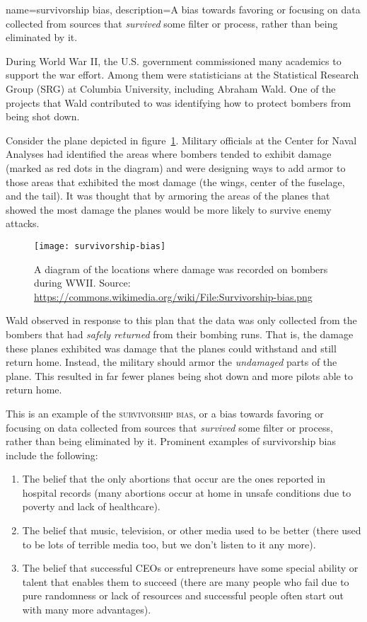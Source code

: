 {
name=survivorship bias,
description={A bias towards favoring or focusing on data collected from sources that \emph{survived} some filter or process, rather than being eliminated by it.}
}

During World War II, the U.S. government commissioned many academics to support the war effort. Among them were statisticians at the Statistical Research Group (SRG) at Columbia University, including Abraham Wald. One of the projects that Wald contributed to was identifying how to protect bombers from being shot down.

Consider the plane depicted in figure~\ref{fig:survivorplane}. Military officials at the Center for Naval Analyses had identified the areas where bombers tended to exhibit damage (marked as red dots in the diagram) and were designing ways to add armor to those areas that exhibited the most damage (the wings, center of the fuselage, and the tail). It was thought that by armoring the areas of the planes that showed the most damage the planes would be more likely to survive enemy attacks.

\begin{figure}[!ht]
\texttt{[image: survivorship-bias]}
\caption{A diagram of the locations where damage was recorded on bombers during WWII. Source: \url{https://commons.wikimedia.org/wiki/File:Survivorship-bias.png}}
\label{fig:survivorplane}
\end{figure} 

Wald observed in response to this plan that the data was only collected from the bombers that had \emph{safely returned} from their bombing runs. That is, the damage these planes exhibited was damage that the planes could withstand and still return home. Instead, the military should armor the \emph{undamaged} parts of the plane. This resulted in far fewer planes being shot down and more pilots able to return home.

This is an example of the \textsc{\gls{survivorship bias}}, or a bias towards favoring or focusing on data collected from sources that \emph{survived} some filter or process, rather than being eliminated by it. Prominent examples of survivorship bias include the following:

\begin{enumerate}
\item The belief that the only abortions that occur are the ones reported in hospital records (many abortions occur at home in unsafe conditions due to poverty and lack of healthcare).
\item The belief that music, television, or other media used to be better (there used to be lots of terrible media too, but we don't listen to it any more).
\item The belief that successful CEOs or entrepreneurs have some special ability or talent that enables them to succeed (there are many people who fail due to pure randomness or lack of resources and successful people often start out with many more advantages).
\end{enumerate}

